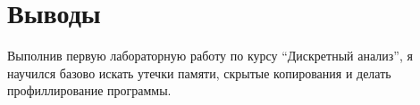 \section{Выводы}
Выполнив первую лабораторную работу по курсу \enquote{Дискретный анализ}, я научился базово искать утечки памяти, скрытые копирования и делать профиллирование программы.
\pagebreak
